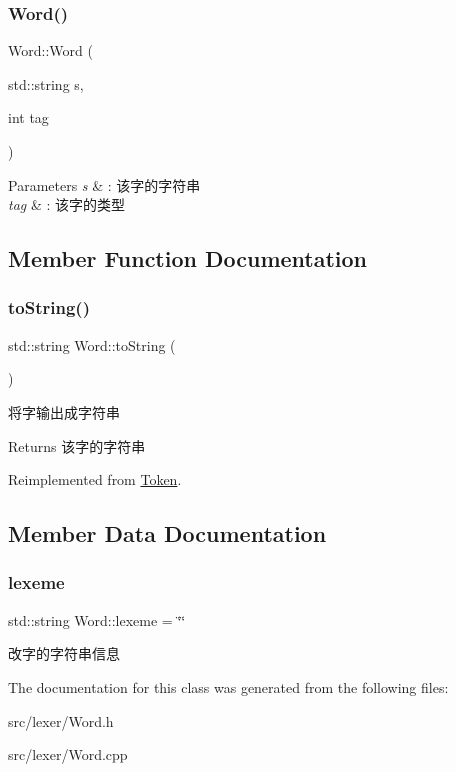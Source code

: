 \subsubsection{\texorpdfstring{Word()}{Word()}}
{\footnotesize\ttfamily Word\+::\+Word (\begin{DoxyParamCaption}\item[{std\+::string}]{s,  }\item[{int}]{tag }\end{DoxyParamCaption})}


\begin{DoxyParams}{Parameters}
{\em s} & \+: 该字的字符串 \\
\hline
{\em tag} & \+: 该字的类型 \\
\hline
\end{DoxyParams}


\subsection{Member Function Documentation}
\mbox{\label{class_word_a950a81bfd0fc369b0eb8d0d6b27e2870}} 
\subsubsection{\texorpdfstring{to\+String()}{toString()}}
{\footnotesize\ttfamily std\+::string Word\+::to\+String (\begin{DoxyParamCaption}{ }\end{DoxyParamCaption})\hspace{0.3cm}{\ttfamily [virtual]}}

将字输出成字符串 \begin{DoxyReturn}{Returns}
该字的字符串 
\end{DoxyReturn}


Reimplemented from \hyperlink{class_token_a8863381edabce7bc1e92473b445ba81f}{Token}.



\subsection{Member Data Documentation}
\mbox{\label{class_word_a34691d869ec57b2a0b7a8eb41230b92a}} 
\subsubsection{\texorpdfstring{lexeme}{lexeme}}
{\footnotesize\ttfamily std\+::string Word\+::lexeme = \char`\"{}\char`\"{}}

改字的字符串信息 

The documentation for this class was generated from the following files\+:\begin{DoxyCompactItemize}
\item 
src/lexer/Word.\+h\item 
src/lexer/Word.\+cpp\end{DoxyCompactItemize}
